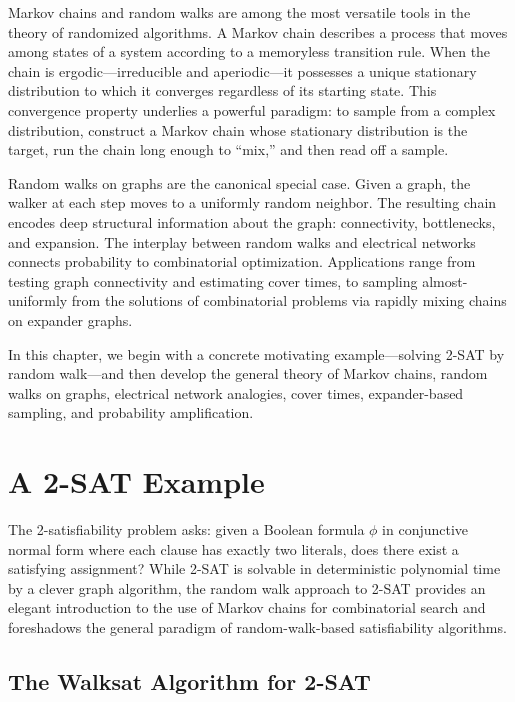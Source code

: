 \documentclass[twoside,12pt]{book}
\theoremstyle{plain}
\theoremstyle{definition}
\theoremstyle{remark}
\begin{document}
Markov chains and random walks are among the most versatile tools in the
theory of randomized algorithms. A Markov chain describes a process that
moves among states of a system according to a memoryless transition rule.
When the chain is ergodic---irreducible and aperiodic---it possesses a
unique stationary distribution to which it converges regardless of its
starting state. This convergence property underlies a powerful paradigm:
to sample from a complex distribution, construct a Markov chain whose
stationary distribution is the target, run the chain long enough to
``mix,'' and then read off a sample.

Random walks on graphs are the canonical special case. Given a graph, the
walker at each step moves to a uniformly random neighbor. The resulting
chain encodes deep structural information about the graph: connectivity,
bottlenecks, and expansion. The interplay between random walks and
electrical networks connects probability to combinatorial optimization.
Applications range from testing graph connectivity and estimating cover
times, to sampling almost-uniformly from the solutions of combinatorial
problems via rapidly mixing chains on expander graphs.

In this chapter, we begin with a concrete motivating example---solving
2-SAT by random walk---and then develop the general theory of Markov
chains, random walks on graphs, electrical network analogies, cover
times, expander-based sampling, and probability amplification.

\section{A 2-SAT Example}
\label{sec:2sat-example}

The 2-satisfiability problem asks: given a Boolean formula $\phi$ in
conjunctive normal form where each clause has exactly two literals, does
there exist a satisfying assignment? While 2-SAT is solvable in
deterministic polynomial time by a clever graph algorithm, the random
walk approach to 2-SAT provides an elegant introduction to the use of
Markov chains for combinatorial search and foreshadows the general
paradigm of random-walk-based satisfiability algorithms.

\subsection{The Walksat Algorithm for 2-SAT}
\end{document}

